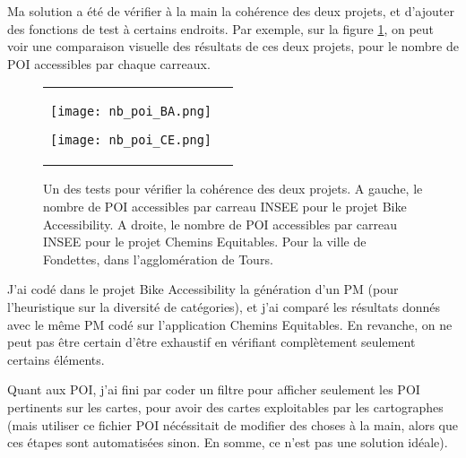 Ma solution a été de vérifier à la main la cohérence des deux projets, et d'ajouter des fonctions de test à certains endroits. Par exemple, sur la figure \ref{fig:nb_poi_compa}, on peut voir une comparaison visuelle des résultats de ces deux projets, pour le nombre de POI accessibles par chaque carreaux.

\begin{figure}[H]
\centering
    \begin{tabular}{cc}    
        \begin{minipage}[t]{2.5in}
        \centering
        \texttt{[image: nb\_poi\_BA.png]}
        \end{minipage}
        \begin{minipage}[t]{2.5in}
        \centering
        \texttt{[image: nb\_poi\_CE.png]}
        \end{minipage}
    \end{tabular}
    \caption{Un des tests pour vérifier la cohérence des deux projets. A gauche, le nombre de POI accessibles par carreau INSEE pour le projet Bike Accessibility. A droite, le nombre de POI accessibles par carreau INSEE pour le projet Chemins Equitables. Pour la ville de Fondettes, dans l'agglomération de Tours.}
    \label{fig:nb_poi_compa}
\end{figure}

J'ai codé dans le projet Bike Accessibility la génération d'un PM (pour l'heuristique sur la diversité de catégories), et j'ai comparé les résultats donnés avec le même PM codé sur l'application Chemins Equitables. En revanche, on ne peut pas être certain d'être exhaustif en vérifiant complètement seulement certains éléments.

Quant aux POI, j'ai fini par coder un filtre pour afficher seulement les POI pertinents sur les cartes, pour avoir des cartes exploitables par les cartographes (mais utiliser ce fichier POI nécéssitait de modifier des choses à la main, alors que ces étapes sont automatisées sinon. En somme, ce n'est pas une solution idéale).
